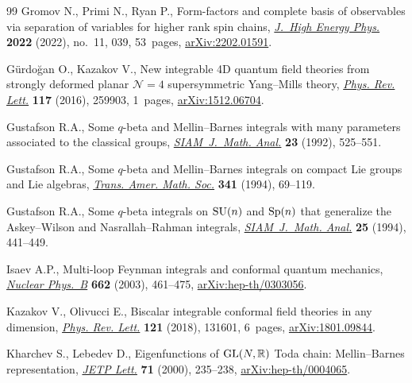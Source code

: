 \documentclass[10pt,a4paper]{amsart}
\numberwithin{equation}{section}
\begin{document}
\begin{thebibliography}{99}
Gromov N., Primi N., Ryan P., Form-factors and complete basis of observables
 via separation of variables for higher rank spin chains,
 \href{https://doi.org/10.1007/jhep11(2022)039}{\textit{J.~High Energy Phys.}}
 \textbf{2022} (2022), no.~11, 039, 53~pages,
 \href{http://arxiv.org/abs/2202.01591}{arXiv:2202.01591}.

G\"urdo\u{g}an O., Kazakov V., {N}ew integrable 4{D} quantum field theories
 from strongly deformed planar {$\mathcal{N}=4$} supersymmetric
 {Y}ang--{M}ills theory,
 \href{https://doi.org/10.1103/PhysRevLett.117.259903}{\textit{Phys. Rev.
 Lett.}} \textbf{117} (2016), 259903, 1~pages,
 \href{http://arxiv.org/abs/1512.06704}{arXiv:1512.06704}.

Gustafson R.A., Some {$q$}-beta and {M}ellin--{B}arnes integrals with many
 parameters associated to the classical groups,
 \href{https://doi.org/10.1137/0523026}{\textit{SIAM~J.~Math. Anal.}}
 \textbf{23} (1992), 525--551.

Gustafson R.A., Some {$q$}-beta and {M}ellin--{B}arnes integrals on compact
 {L}ie groups and {L}ie algebras,
 \href{https://doi.org/10.2307/2154615}{\textit{Trans. Amer. Math. Soc.}}
 \textbf{341} (1994), 69--119.

Gustafson R.A., Some {$q$}-beta integrals on {${\rm SU}(n)$} and {${\rm
 Sp}(n)$} that generalize the {A}skey--{W}ilson and {N}asrallah--{R}ahman
 integrals,
 \href{https://doi.org/10.1137/S0036141092248614}{\textit{SIAM~J.~Math.
 Anal.}} \textbf{25} (1994), 441--449.

Isaev A.P., Multi-loop {F}eynman integrals and conformal quantum mechanics,
 \href{https://doi.org/10.1016/S0550-3213(03)00393-6}{\textit{Nuclear
 Phys.~B}} \textbf{662} (2003), 461--475,
 \href{http://arxiv.org/abs/hep-th/0303056}{arXiv:hep-th/0303056}.

Kazakov V., Olivucci E., Biscalar integrable conformal field theories in any
 dimension,
 \href{https://doi.org/10.1103/PhysRevLett.121.131601}{\textit{Phys. Rev.
 Lett.}} \textbf{121} (2018), 131601, 6~pages,
 \href{http://arxiv.org/abs/1801.09844}{arXiv:1801.09844}.

Kharchev S., Lebedev D., Eigenfunctions of ${\rm GL}(N,\mathbb{R})$ {T}oda
 chain: {M}ellin--{B}arnes representation,
 \href{https://doi.org/10.1134/1.568323}{\textit{JETP Lett.}} \textbf{71}
 (2000), 235--238,
 \href{http://arxiv.org/abs/hep-th/0004065}{arXiv:hep-th/0004065}.


\end{thebibliography}
\end{document}
